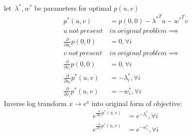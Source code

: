 \documentclass[12pt,letter]{article}
\begin{document}
\begin{enumerate}
  let\ $\lambda^*, w^*$ be parameters for optimal $p(u,v)$
  \begin{align*}
    p^*(u,v) &= p(0,0) -{\lambda^*}^Tu- {w^*}^Tv\\
             u\ not\ present\ &in\ original\ problem \implies\\
    \frac{\partial}{\partial u_i}p(0,0) &= 0, \forall i\\
             v\ not\ present\ &in\ original\ problem \implies\\
    \frac{\partial}{\partial v_i}p(0,0) &= 0, \forall i\\
    \frac{\partial}{\partial u_i} p^*(u,v) &= -\lambda_i^*, \forall i\\
    \frac{\partial}{\partial v_i} p^*(u,v) &= -w_i^*, \forall i
  \end{align*}
  Inverse log transform $x \to e^x$ into original form of objective:
  \begin{align*}
    e^{\frac{\partial}{\partial u_i} p^*(u,v)} &= e^{-\lambda_i^*}, \forall i\\
    e^{\frac{\partial}{\partial v_i} p^*(u,v)} &= e^{-w_i^*}, \forall i\\
  \end{align*}
  

\end{enumerate}
\end{document}
